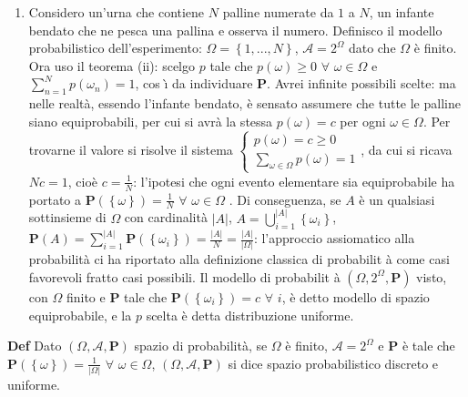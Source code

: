 \documentclass{article}
\begin{document}
\begin{enumerate}
\item Considero un'urna che contiene $N$ palline numerate da $1$ a $N$, un
infante bendato che ne pesca una pallina e osserva il numero. Definisco il
modello probabilistico dell'esperimento: $\Omega =\left\{ 1,...,N\right\} $, 
$\mathcal{A}=2^{\Omega }$ dato che $\Omega $ \`{e} finito. Ora uso il
teorema (ii): scelgo $p$ tale che $p\left( \omega \right) \geq 0$ $\forall $ 
$\omega \in \Omega $ e $\sum_{n=1}^{N}p\left( \omega _{n}\right) =1$, cos%
\`{\i} da individuare $\mathbf{P}$. Avrei infinite possibili scelte: ma
nelle realt\`{a}, essendo l'infante bendato, \`{e} sensato assumere che
tutte le palline siano equiprobabili, per cui si avr\`{a} la stessa $p\left(
\omega \right) =c$ per ogni $\omega \in \Omega $. Per trovarne il valore si
risolve il sistema $\left\{ 
\begin{array}{c}
p\left( \omega \right) =c\geq 0 \\ 
\sum_{\omega \in \Omega }p\left( \omega \right) =1%
\end{array}%
\right. $, da cui si ricava $Nc=1$, cio\`{e} $c=\frac{1}{N}$: l'ipotesi che
ogni evento elementare sia equiprobabile ha portato a $\mathbf{P}\left(
\left\{ \omega \right\} \right) =\frac{1}{N}$ $\forall $ $\omega \in \Omega $%
. Di conseguenza, se $A$ \`{e} un qualsiasi sottinsieme di $\Omega $ con
cardinalit\`{a} $\left\vert A\right\vert $, $A=\bigcup_{i=1}^{\left\vert
A\right\vert }\left\{ \omega _{i}\right\} $, $\mathbf{P}\left( A\right)
=\sum_{i=1}^{\left\vert A\right\vert }\mathbf{P}\left( \left\{ \omega
_{i}\right\} \right) =\frac{\left\vert A\right\vert }{N}=\frac{\left\vert
A\right\vert }{\left\vert \Omega \right\vert }$: l'approccio assiomatico
alla probabilit\`{a} ci ha riportato alla definizione classica di probabilit%
\`{a} come casi favorevoli fratto casi possibili. Il modello di probabilit%
\`{a} $\left( \Omega ,2^{\Omega },\mathbf{P}\right) $ visto, con $\Omega $
finito e $\mathbf{P}$ tale che $\mathbf{P}\left( \left\{ \omega _{i}\right\}
\right) =c$ $\forall $ $i$, \`{e} detto modello di spazio equiprobabile, e
la $p$ scelta \`{e} detta distribuzione uniforme.
\end{enumerate}

\textbf{Def} Dato $\left( \Omega ,\mathcal{A},\mathbf{P}\right) $ spazio di
probabilit\`{a}, se $\Omega $ \`{e} finito, $\mathcal{A}=2^{\Omega }$ e $%
\mathbf{P}$ \`{e} tale che $\mathbf{P}\left( \left\{ \omega \right\} \right)
=\frac{1}{\left\vert \Omega \right\vert }$ $\forall $ $\omega \in \Omega $, $%
\left( \Omega ,\mathcal{A},\mathbf{P}\right) $ si dice spazio probabilistico
discreto e uniforme.
\end{document}
